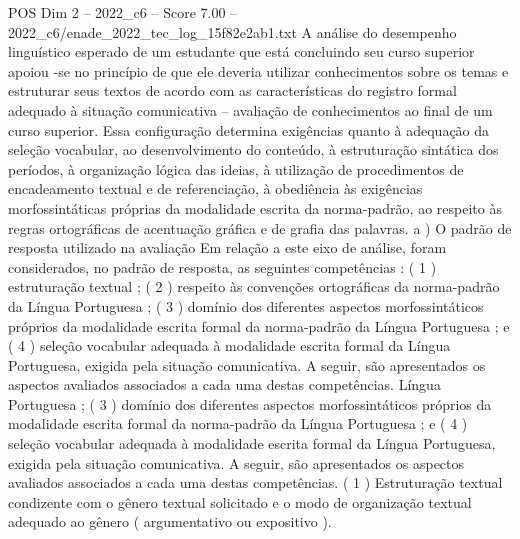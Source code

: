 \begin{textsample}{POS Dim 2 – 2022\_c6 – Score 7.00 – 2022\_c6/enade\_2022\_tec\_log\_15f82e2ab1.txt}
A análise do desempenho linguístico esperado de um estudante que está concluindo seu curso superior apoiou -se no princípio de que ele deveria utilizar conhecimentos sobre os temas e estruturar seus textos de acordo com as características do registro formal adequado à situação comunicativa – avaliação de conhecimentos ao final de um curso superior.
Essa configuração determina exigências quanto à adequação da seleção vocabular, ao desenvolvimento do conteúdo, à estruturação sintática dos períodos, à organização lógica das ideias, à utilização de procedimentos de encadeamento textual e de referenciação, à obediência às exigências morfossintáticas próprias da modalidade escrita da norma-padrão, ao respeito às regras ortográficas de acentuação gráfica e de grafia das palavras. a ) O padrão de resposta utilizado na avaliação Em relação a este eixo de análise, foram considerados, no padrão de resposta, as seguintes competências : ( 1 ) estruturação textual ; ( 2 ) respeito às convenções ortográficas da norma-padrão da Língua Portuguesa ; ( 3 ) domínio dos diferentes aspectos morfossintáticos próprios da modalidade escrita formal da norma-padrão da Língua Portuguesa ; e ( 4 ) seleção vocabular adequada à modalidade escrita formal da Língua Portuguesa, exigida pela situação comunicativa.
A seguir, são apresentados os aspectos avaliados associados a cada uma destas competências.
Língua Portuguesa ; ( 3 ) domínio dos diferentes aspectos morfossintáticos próprios da modalidade escrita formal da norma-padrão da Língua Portuguesa ; e ( 4 ) seleção vocabular adequada à modalidade escrita formal da Língua Portuguesa, exigida pela situação comunicativa.
A seguir, são apresentados os aspectos avaliados associados a cada uma destas competências. ( 1 ) Estruturação textual condizente com o gênero textual solicitado e o modo de organização textual adequado ao gênero ( argumentativo ou expositivo ).

\end{textsample}

